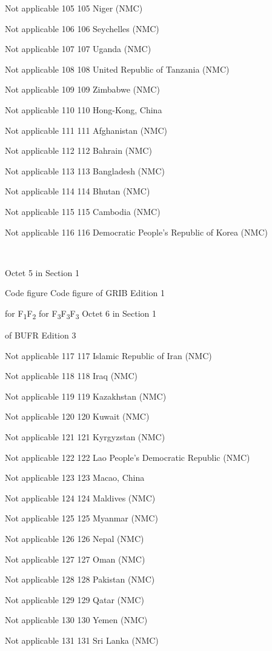 Not applicable 105 105 Niger (NMC)

Not applicable 106 106 Seychelles (NMC)

Not applicable 107 107 Uganda (NMC)

Not applicable 108 108 United Republic of Tanzania (NMC)

Not applicable 109 109 Zimbabwe (NMC)

Not applicable 110 110 Hong-Kong, China

Not applicable 111 111 Afghanistan (NMC)

Not applicable 112 112 Bahrain (NMC)

Not applicable 113 113 Bangladesh (NMC)

Not applicable 114 114 Bhutan (NMC)

Not applicable 115 115 Cambodia (NMC)

Not applicable 116 116 Democratic People's Republic of Korea (NMC)

\textbf{\\
}

Octet 5 in Section 1

Code figure Code figure of GRIB Edition 1

for F\textsubscript{1}F\textsubscript{2} for F\textsubscript{3}F\textsubscript{3}F\textsubscript{3} Octet 6 in Section 1

of BUFR Edition 3

Not applicable 117 117 Islamic Republic of Iran (NMC)

Not applicable 118 118 Iraq (NMC)

Not applicable 119 119 Kazakhstan (NMC)

Not applicable 120 120 Kuwait (NMC)

Not applicable 121 121 Kyrgyzstan (NMC)

Not applicable 122 122 Lao People's Democratic Republic (NMC)

Not applicable 123 123 Macao, China

Not applicable 124 124 Maldives (NMC)

Not applicable 125 125 Myanmar (NMC)

Not applicable 126 126 Nepal (NMC)

Not applicable 127 127 Oman (NMC)

Not applicable 128 128 Pakistan (NMC)

Not applicable 129 129 Qatar (NMC)

Not applicable 130 130 Yemen (NMC)

Not applicable 131 131 Sri Lanka (NMC)


